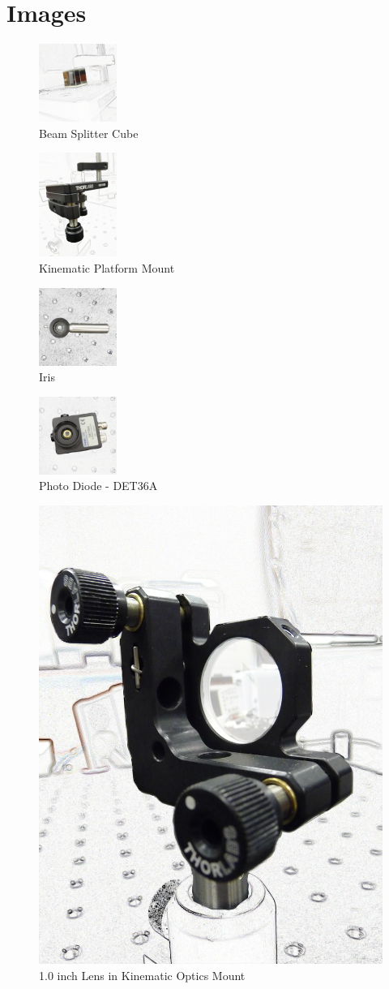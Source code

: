 \section{Images}

\begin{figure}[!ht]
\centering
\includegraphics[width=1in]{BeamSplitterCube}
\caption{Beam Splitter Cube}
\label{fig:beamsplittercube}
\end{figure}

\begin{figure}[!ht]
\centering
\includegraphics[width=1in]{KinematicPlatformMount}
\caption{Kinematic Platform Mount}
\label{fig:kinematicplatformmount}
\end{figure}

\begin{figure}[!ht]
\centering
\includegraphics[width=1in]{Iris}
\caption{Iris}
\label{fig:iris}
\end{figure}

\begin{figure}[!ht]
\centering
\includegraphics[width=1in]{PhotoDiode}
\caption{Photo Diode - DET36A}
\label{fig:phtodiode}
\end{figure}

\begin{figure}[!ht]
\centering
\includegraphics[width=1 in]{LensinHolder}
\caption{1.0 inch Lens in Kinematic Optics Mount}
\label{fig:lens}
\end{figure}



